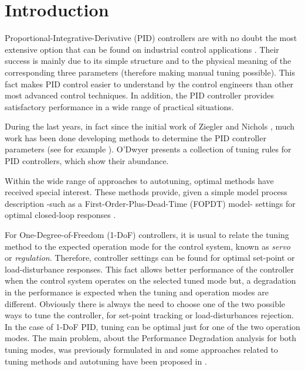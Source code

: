 %
\section{Introduction}
%

Proportional-Integrative-Derivative (PID) {contro\-llers} are with
no doubt the most extensive option that can be found on industrial
control applications \cite{astromCEP2001}. Their success is mainly
due to its simple structure and to the physical meaning of the
corresponding three parameters (therefore making manual tuning
possible). This fact makes PID control easier to understand by the
control engineers than other most advanced control techniques. In
addition, the PID controller provides satisfactory performance in
a wide range of practical situations.

During the last years, in fact since the initial work of Ziegler
and Nichols \cite{zieglernichols42}, much work has been done
developing methods to determine the PID controller parameters (see
for example
\cite{astromJPC2004,skogestadJPC2003,kristianssonJPC2006}).
O'Dwyer \cite{odwyer2003} presents a collection of tuning rules
for PID controllers, which show their abundance.

Within the wide range of approaches to autotuning, optimal methods
have received special interest. These methods provide, given a
simple model process description -such as a
First-Order-Plus-Dead-Time (FOPDT) model- settings for optimal
closed-loop responses \cite{zhuangAthertonIEE1993}.

For One-Degree-of-Freedom (1-DoF) controllers, it is usual to
relate the tuning method to the expected operation mode for the
control system, known as \emph{servo} or \emph{regulation}.
Therefore, controller settings can be found for optimal set-point
or load-disturbance responses. This fact allows better performance
of the controller when the control system operates on the selected
tuned mode but, a degradation in the performance is expected when
the tuning and operation modes are different. Obviously there is
always the need to choose one of the two possible ways to tune the
controller, for set-point tracking or load-disturbances rejection.
In the case of 1-DoF PID, tuning can be optimal just for one of
the two operation modes. The main problem, about the Performance
Degradation analysis for both tuning modes, was previously
formulated in \cite{arrietaCSC2007} and some approaches related to
tuning methods and autotuning have been proposed in
\cite{arrietaMED2007,arrietaCDC2007}.

